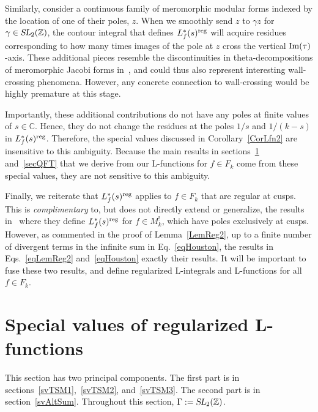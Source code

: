 \documentclass[11pt,a4paper]{article}
\newcommand{\g}{\gamma}
\newcommand{\G}{\Gamma}
\def\C{\mathbb{C}}
\def\Z{\mathbb{Z}}
\newcommand{\SL}{\operatorname{\textsl{SL}}}	 	%
\newcommand{\reg}{{\rm reg}}
\begin{document}
Similarly, consider a continuous family of meromorphic modular forms indexed by the location of one of their poles, $z$. When we smoothly send $z$ to $\g z$ for $\g \in \SL_2(\Z)$, the contour integral that defines $L_f^*(s)^\reg$ will acquire residues corresponding to how many times images of the pole at $z$ cross the vertical ${\rm Im}(\tau)$-axis. These additional pieces resemble the discontinuities in theta-decompositions of meromorphic Jacobi forms in~\cite{23-Zwegers, 24-DMZ}, and could thus also represent interesting wall-crossing phenomena. However, any concrete connection to wall-crossing would be highly premature at this stage.

Importantly, these additional contributions do not have any poles at finite values of $s \in \C$. Hence, they do not change the residues at the poles $1/s$ and $1/(k-s)$ in $L_f^*(s)^\reg$. Therefore, the special values discussed in Corollary~\ref{CorLfn2} are insensitive to this ambiguity. Because the main results in sections~\ref{secSV} and~\ref{secQFT} that we derive from our L-functions for $f \in F_k$ come from these special values, they are not sensitive to this ambiguity. 

Finally, we reiterate that $L_f^*(s)^\reg$ applies to $f \in F_k$ that are regular at cusps. This is {\em complimentary} to, but does not directly extend or generalize, the results in~\cite{04-BFK, 05-BFK2} where they define $L_f^*(s)^\reg$ for $f \in M_k^!$, which have poles exclusively at cusps. However, as commented in the proof of Lemma~\ref{LemReg2}, up to a finite number of divergent terms in the infinite sum in Eq.~\eqref{eqHouston}, the results in Eqs.~\eqref{eqLemReg2} and~\eqref{eqHouston} exactly their results. It will be important to fuse these two results, and define regularized L-integrals and L-functions for all $f \in F_k$.


\section{Special values of regularized L-functions}\label{secSV}

This section has two principal components. The first part is in sections~\ref{svTSM1},~\ref{svTSM2}, and~\ref{svTSM3}. The second part is in section~\ref{svAltSum}. Throughout this section, $\G := \SL_2(\Z)$.
\end{document}
